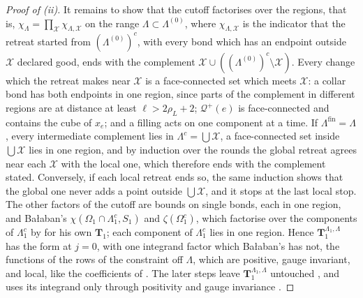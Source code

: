 \documentclass[11pt]{preprint}
\numberwithin{equation}{section}
\theoremstyle{definition}
\theoremstyle{remark}
\theoremstyle{plain}
\begin{document}
\begin{proof}[Proof of (ii)]
It remains to show that the cutoff factorises over the regions, that is, $\chi_\Lambda = \prod_{\mathcal X}\chi_{\Lambda, \mathcal X}$ on the range $\Lambda \subset \Lambda^{(0)}$, where $\chi_{\Lambda, \mathcal X}$ is the indicator that the retreat started from $(\Lambda^{(0)})^c$, with every bond which has an endpoint outside $\mathcal X$ declared good, ends with the complement $\mathcal X \cup ((\Lambda^{(0)})^c \setminus \mathcal X)$. Every change which the retreat makes near $\mathcal X$ is a face-connected set which meets $\mathcal X$: a collar bond has both endpoints in one region, since parts of the complement in different regions are at distance at least $\ell > 2\rho_L + 2$; $\mathcal Q^+(e)$ is face-connected and contains the cube of $x_e$; and a filling acts on one component at a time. If $\Lambda^{\mathrm{fin}} = \Lambda$, every intermediate complement lies in $\Lambda^c = \bigcup\mathcal X$, a face-connected set inside $\bigcup\mathcal X$ lies in one region, and by induction over the rounds the global retreat agrees near each $\mathcal X$ with the local one, which therefore ends with the complement stated. Conversely, if each local retreat ends so, the same induction shows that the global one never adds a point outside $\bigcup\mathcal X$, and it stops at the last local stop. The other factors of the cutoff are bounds on single bonds, each in one region, and Ba{\l}aban's $\chi(\Omega_1 \cap \Lambda_1^c, S_1)$ and $\zeta(\Omega_1^c)$, which factorise over the components of $\Lambda_1^c$ by \cite[(2.19)]{BalabanCRE} for his own $\mathbf T_1$; each component of $\Lambda_1^c$ lies in one region. Hence $\mathbf T_1^{\Lambda_1, \Lambda}$ has the form \cite[(2.19)--(2.21)]{BalabanCRE} at $j = 0$, with one integrand factor which Ba{\l}aban's has not, the functions of the rows of the constraint off $\Lambda$, which are positive, gauge invariant, and local, like the coefficients of \cite[(1.29)]{BalabanCRE}. The later steps leave $\mathbf T_1^{\Lambda_1, \Lambda}$ untouched \cite[(2.22), p.~258]{BalabanCRE}, and \cite{BalabanLFR2} uses its integrand only through positivity and gauge invariance \cite[p.~379]{BalabanLFR2}.
\end{proof}
\end{document}
